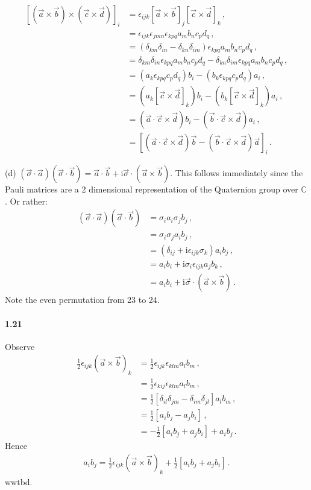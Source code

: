 \documentclass{article}
\newcommand*\C{\mathbb C}
\newcommand*\te[1]{\text{#1}}
\newcommand*\p[1]{\left(#1\right)}
\newcommand*\ps[1]{\left[#1\right]}
\newcommand*\f[2]{\frac{#1}{#2}}
\newcommand*\I{\te{i}}
\begin{document}
\begin{description}
\begin{align}
\ps{(\vec a\times\vec b)\times(\vec c\times\vec d)}_i&=\epsilon_{ijk}\ps{\vec a\times\vec b}_j\ps{\vec c\times\vec d}_k\,,\\
&=\epsilon_{ijk}\epsilon_{jmn}\epsilon_{kpq}a_mb_nc_p d_q\,,\\
&=\p{\delta_{km}\delta_{in}-\delta_{kn}\delta_{im}}\epsilon_{kpq}a_mb_nc_p d_q\,,\\
&=\delta_{km}\delta_{in}\epsilon_{kpq}a_mb_nc_p d_q-\delta_{kn}\delta_{im}\epsilon_{kpq}a_mb_nc_p d_q\,,\\
&=\p{a_k\epsilon_{kpq}c_p d_q}b_i-\p{b_k\epsilon_{kpq}c_p d_q}a_i\,,\\
&=\p{a_k\ps{\vec c\times\vec d}_k}b_i-\p{b_k\ps{\vec c\times\vec d}_k}a_i\,,\\
&=\p{\vec a\cdot \vec c\times\vec d}b_i-\p{\vec b\cdot \vec c\times\vec d}a_i\,,\\
&=\ps{\p{\vec a\cdot \vec c\times\vec d}\vec b-\p{\vec b\cdot \vec c\times\vec d}\vec a}_i\,.
\end{align}
\item{(d)} $(\vec\sigma\cdot\vec a)(\vec \sigma\cdot\vec b) = \vec a\cdot\vec b + \I\vec\sigma\cdot(\vec a\times\vec b)$. This follows immediately since the Pauli matrices are a 2 dimensional representation of the Quaternion group over $\C$. Or rather:
\begin{align}
(\vec\sigma\cdot\vec a)(\vec \sigma\cdot\vec b)&=\sigma_ia_i\sigma_jb_j\,,\\
&=\sigma_i\sigma_ja_ib_j\,,\\
&=\p{\delta_{ij}+\I\epsilon_{ijk}\sigma_k}a_ib_j\,,\\
&=a_ib_i+\I \sigma_i \epsilon_{ijk}a_jb_k\,,\\
&=a_ib_i+\I\vec\sigma\cdot (\vec a\times \vec b)\,.
\end{align}
Note the even permutation from 23 to 24.
\end{description}
\paragraph{1.21} Observe
\begin{align}
\f12\epsilon_{ijk}(\vec a\times\vec b)_k &= \f12\epsilon_{ijk}\epsilon_{klm}a_l b_m\,,\\
&=\f12\epsilon_{kij}\epsilon_{klm}a_l b_m\,,\\
&=\f12\ps{\delta_{il}\delta_{jm}-\delta_{im}\delta_{jl}}a_l b_m\,,\\
&=\f12\ps{a_i b_j-a_j b_i}\,,\\
&=-\f12\ps{a_i b_j+a_j b_i}+a_ib_j\,.
\end{align}
Hence
\begin{align}
a_ib_j=\f12\epsilon_{ijk}(\vec a\times\vec b)_k+\f12\ps{a_i b_j+a_j b_i}\,.
\end{align}
wwtbd.
\end{document}

